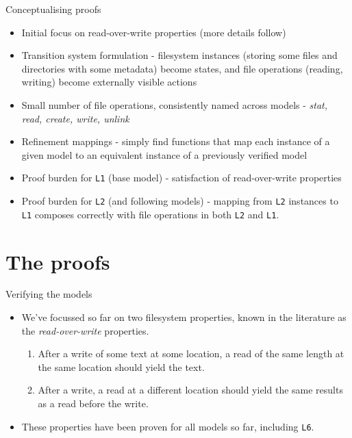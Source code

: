 \documentclass{beamer}
\begin{document}
\begin{frame}{Conceptualising proofs}
  \begin{itemize}
  \item Initial focus on read-over-write properties (more details follow)
  \item Transition system formulation - filesystem instances
    (storing some files and directories with some metadata) become
    states, and file operations (reading, writing) become externally
    visible actions
  \item Small number of file operations, consistently named across
    models - \textit{stat, read, create, write, unlink}
  \item Refinement mappings - simply find functions that map each
    instance of a given model to an equivalent instance of a
    previously verified model
  \item Proof burden for \texttt{L1} (base model) - satisfaction of
    read-over-write properties
  \item Proof burden for \texttt{L2} (and following models) - mapping
    from \texttt{L2} instances to \texttt{L1} composes correctly with
    file operations in both \texttt{L2} and \texttt{L1}.
  \end{itemize}
\end{frame}

\section{The proofs}

\begin{frame}{Verifying the models}
  \begin{itemize}
  \item We've focussed so far on two filesystem properties, known in
    the literature as the \textit{read-over-write} properties.
    \begin{enumerate}
    \item After a write of some text at some location, a read of the
      same length at the same location should yield the text.
    \item After a write, a read at a different location should yield
      the same results as a read before the write.
    \end{enumerate}
  \item These properties have been proven for all models so far,
    including \texttt{L6}.
  \end{itemize}
\end{frame}
\end{document}
